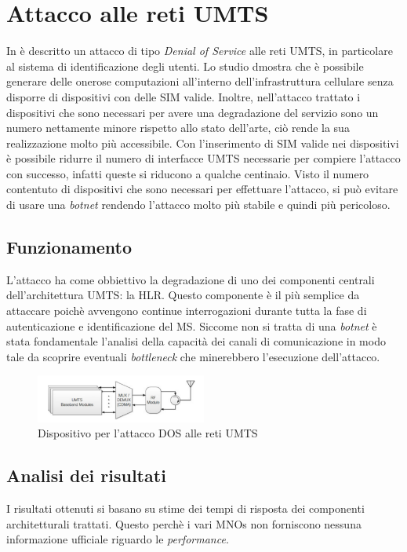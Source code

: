 \section{Attacco alle reti UMTS}
In \cite{umts-dos} è descritto un attacco di tipo \textit{Denial of Service} alle reti UMTS, in particolare al
sistema di identificazione degli utenti. 
Lo studio dmostra che è possibile generare delle onerose computazioni all'interno dell'infrastruttura cellulare senza 
disporre di dispositivi con delle SIM valide. Inoltre, nell'attacco trattato i dispositivi che sono necessari per avere una 
degradazione del servizio sono un numero nettamente minore rispetto allo stato dell'arte, ciò rende la sua realizzazione molto
più accessibile. Con l'inserimento di SIM valide nei dispositivi è possibile ridurre il numero di interfacce UMTS necessarie per compiere 
l'attacco con successo, infatti queste si riducono a qualche centinaio.
Visto il numero contentuto di dispositivi che sono necessari per effettuare l'attacco, si può evitare di usare una \textit{botnet} rendendo l'attacco
molto più stabile e quindi più pericoloso.
\subsection{Funzionamento}
L'attacco ha come obbiettivo la degradazione di uno dei componenti centrali dell'architettura UMTS: la HLR. Questo componente è il più semplice da 
attaccare poichè avvengono continue interrogazioni durante tutta la fase di autenticazione e identificazione del MS.
Siccome non si tratta di una \textit{botnet} è stata fondamentale l'analisi della capacità dei canali di comunicazione in modo tale da scoprire eventuali
\textit{bottleneck} che minerebbero l'esecuzione dell'attacco.
\begin{figure}[h]
    \centering
    \includegraphics[width=0.5\textwidth]{images/umts-dos-device.png}
    \caption{Dispositivo per l'attacco DOS alle reti UMTS\cite{umts-dos}}
\end{figure}
\subsection{Analisi dei risultati}
I risultati ottenuti si basano su stime dei tempi di risposta dei componenti architetturali trattati. Questo perchè i vari MNOs non forniscono nessuna 
informazione ufficiale riguardo le \textit{performance}.